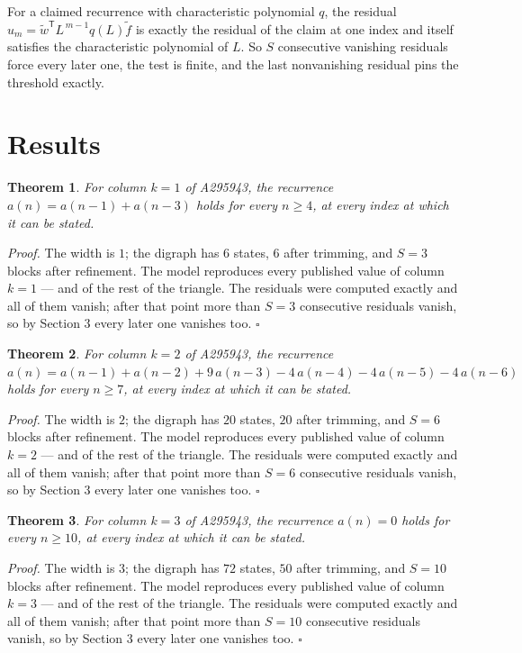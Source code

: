 \documentclass[11pt]{article}
\newtheorem{theorem}{Theorem}
\theoremstyle{definition}
\begin{document}
For a claimed recurrence with characteristic polynomial $q$, the residual $u_m = \tilde w^{\mathsf T}L^{\,m-1}q(L)\tilde f$ is exactly the residual of the claim at one index and itself satisfies the characteristic polynomial of $L$. So $S$ consecutive vanishing residuals force every later one, the test is finite, and the last nonvanishing residual pins the threshold exactly.

\section{Results}

\begin{theorem} For column $k = 1$ of A295943, the recurrence $a(n) = a(n-1) + a(n-3)$ holds for every $n \ge 4$, at every index at which it can be stated.\end{theorem}

{\itshape Proof.} The width is $1$; the digraph has $6$ states, $6$ after trimming, and $S = 3$ blocks after refinement. The model reproduces every published value of column $k = 1$ --- and of the rest of the triangle. The residuals were computed exactly and all of them vanish; after that point more than $S = 3$ consecutive residuals vanish, so by Section 3 every later one vanishes too. $\square$

\begin{theorem} For column $k = 2$ of A295943, the recurrence $a(n) = a(n-1) + a(n-2) + 9\,a(n-3) - 4\,a(n-4) - 4\,a(n-5) - 4\,a(n-6)$ holds for every $n \ge 7$, at every index at which it can be stated.\end{theorem}

{\itshape Proof.} The width is $2$; the digraph has $20$ states, $20$ after trimming, and $S = 6$ blocks after refinement. The model reproduces every published value of column $k = 2$ --- and of the rest of the triangle. The residuals were computed exactly and all of them vanish; after that point more than $S = 6$ consecutive residuals vanish, so by Section 3 every later one vanishes too. $\square$

\begin{theorem} For column $k = 3$ of A295943, the recurrence $a(n) = 0$ holds for every $n \ge 10$, at every index at which it can be stated.\end{theorem}

{\itshape Proof.} The width is $3$; the digraph has $72$ states, $50$ after trimming, and $S = 10$ blocks after refinement. The model reproduces every published value of column $k = 3$ --- and of the rest of the triangle. The residuals were computed exactly and all of them vanish; after that point more than $S = 10$ consecutive residuals vanish, so by Section 3 every later one vanishes too. $\square$
\end{document}

